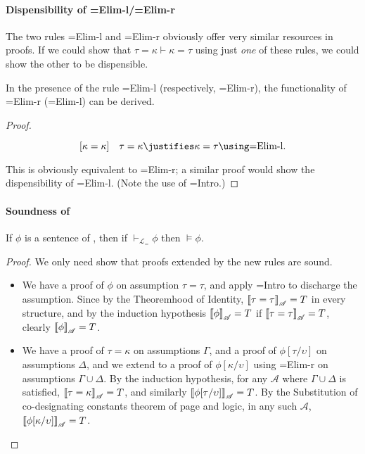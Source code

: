 \paragraph{Dispensibility of =Elim-l/=Elim-r}

The two rules =Elim-l and =Elim-r obviously offer very similar resources in proofs. If we could show that $\tau=\kappa \vdash \kappa=\tau$ using just \emph{one} of these rules, we could show the other to be dispensible.

\begin{theorem}[Dispensibility of =Elim-r (or =Elim-l)]
	In the presence of the rule =Elim-l (respectively, =Elim-r), the functionality of =Elim-r (=Elim-l) can be derived. \begin{proof}{
		\begin{prooftree} \phi[\tau/\upsilon]\quad \[[\kappa=\kappa] \quad \tau=\kappa \justifies \kappa=\tau \using \text{=Elim-l}.\] \justifies \phi[\kappa/\upsilon] \using {}
		\end{prooftree}
		
 This is obviously equivalent to =Elim-r; a similar proof would show the dispensibility of =Elim-l. (Note the use of =Intro.)}
	\end{proof}
\end{theorem}

\paragraph{Soundness of \lequ}

\begin{theorem}
If $\phi$ is a sentence of \lequ, then if $\vdash_{\!\mathcal{L}_{=}} \phi$ then $\vDash \phi$. \begin{proof}
	 We only need show that proofs extended by the new rules are sound. \begin{itemize}
		\item We have a proof of $\phi$ on assumption $\tau=\tau$, and apply =Intro to discharge the assumption. Since by the Theoremhood of Identity, $\left\llbracket \tau=\tau\right\rrbracket_{\mathscr{A}}=T$ in every structure, and by the induction hypothesis $\left\llbracket \phi\right\rrbracket_{\mathscr{A}}=T$ if $\left\llbracket \tau=\tau\right\rrbracket_{\mathscr{A}}=T$, clearly $\left\llbracket \phi\right\rrbracket_{\mathscr{A}}=T$.
		\item We have a proof of $\tau=\kappa$ on assumptions $\Gamma$, and a proof of $\phi[\tau/\upsilon]$ on assumptions $\Delta$, and we extend to a proof of $\phi[\kappa/\upsilon]$ using =Elim-r on assumptions $\Gamma\cup\Delta$. By the induction hypothesis, for any $\mathscr{A}$ where $\Gamma\cup\Delta$ is satisfied,  $\left\llbracket \tau=\kappa\right\rrbracket_{\mathscr{A}}=T$, and similarly $\left\llbracket \phi[\tau/\upsilon]\right\rrbracket_{\mathscr{A}}=T$. By the Substitution of co-designating constants theorem of page \pageref{scdc} and logic, in any such $\mathscr{A}$, $\left\llbracket \phi[\kappa/\upsilon]\right\rrbracket_{\mathscr{A}}=T$. 
	\end{itemize} 
\end{proof}
\end{theorem}

